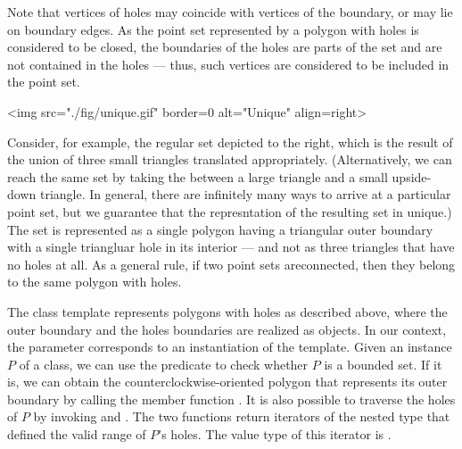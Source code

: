 Note that vertices of holes may coincide with vertices of the boundary, or may
lie on boundary edges. As the point set represented by a polygon with holes is
considered to be closed, the boundaries of the holes are parts of the set
and are not contained in the holes --- thus, such vertices are considered to
be included in the point set.
\lcTex{%
  \setlength{\widthRight}{1.4cm}
  \setlength{\widthLeft}{\widthLineReal}
  \addtolength{\widthLeft}{-\widthRight}
  \begin{minipage}{\widthLeft}
}
\label{fig:unique}
\begin{ccHtmlOnly}
  <img src="./fig/unique.gif" border=0 alt="Unique" align=right>
\end{ccHtmlOnly}
Consider, for example, the regular set depicted to the right, which is the
result of the union of three small triangles translated appropriately.
(Alternatively, we can reach the same set by taking the
 between a large triangle and a small
upside-down triangle. In general, there are infinitely many ways to arrive at
a particular point set, but we guarantee that the represntation of the
resulting set in unique.) The set is represented as a single polygon having a
triangular outer boundary with a single triangluar hole in its interior ---
and not as three triangles that have no holes at all. As a general rule,
if two point sets areconnected, then they belong to the same polygon with
holes.

The class template  represents
polygons with holes as described above, where the outer boundary and the
holes boundaries are realized as  objects. In our context,
the  parameter corresponds to an instantiation of the
 template. Given an instance $P$ of a
 class, we can use the predicate 
 to check whether $P$ is a bounded set. If it is,
we can obtain the counterclockwise-oriented polygon that represents its
outer boundary by calling the member function .
It is also possible to traverse the holes of $P$ by invoking
 and . The two functions return
iterators of the nested type
 that
defined the valid range of $P$'s holes. The value type of this iterator
is .


